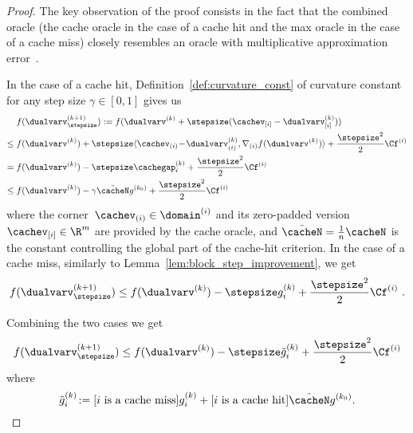 \documentclass{article}
\begin{document}
\begin{proof}
The key observation of the proof consists in the fact that the combined oracle (the cache oracle in the case of a cache hit and the max oracle in the case of a cache miss) closely resembles an oracle with multiplicative approximation error~\citep[Eq.~(12) of Appendix~C]{lacosteJulien13bcfw}.

In the case of a cache hit, Definition~\ref{def:curvature_const} of curvature constant for any step size $\gamma \in [0,1]$ gives us
\begin{align*}
 &f(\dualvarv^{(k+1)}_\stepsize) := f(\dualvarv^{(k)}+\stepsize(\cachev_{[i]}-\dualvarv^{(k)}_{[i]})) \\
    \leq \; & f(\dualvarv^{(k)}) + \stepsize \langle \cachev_{(i)}\!-\!\dualvarv^{(k)}_{(i)}, \nabla_{(i)} f(\dualvarv^{(k)})\rangle + \frac{\stepsize^2}{2}\Cf^{(i)} \\
     = \;& f(\dualvarv^{(k)})- \stepsize \cachegap_i^{(k)} + \frac{\stepsize^2}{2}\Cf^{(i)} \\
     \leq \;& f(\dualvarv^{(k)}) - \gamma \tilde{\cacheN} g^{(k_0)} + \frac{\stepsize^2}{2}\Cf^{(i)}
\end{align*}
where the corner~$\cachev_{(i)} \in \domain^{(i)}$ and its zero-padded version~$\cachev_{[i]} \in \R^m$ are provided by the cache oracle, and $\tilde{\cacheN} = \frac1n \cacheN$ is the constant controlling the global part of the cache-hit criterion.
In the case of a cache miss, similarly to Lemma~\ref{lem:block_step_improvement}, we get
\begin{equation*}
    f(\dualvarv^{(k+1)}_\stepsize) \leq f(\dualvarv^{(k)}) - \stepsize g_i^{(k)} + \frac{\stepsize^2}{2}\Cf^{(i)} \ .
\end{equation*}

Combining the two cases we get 
\begin{equation}
\label{eq:cache_proof:block_descent}
    f(\dualvarv^{(k+1)}_\stepsize) \leq f(\dualvarv^{(k)}) - \stepsize \tilde{g}_i^{(k)} + \frac{\stepsize^2}{2}\Cf^{(i)}
\end{equation}
where
\[
\tilde{g}_i^{(k)}\! := [i \text{ is a cache miss}] g_i^{(k)}  +   [i \text{ is a cache hit}] \tilde{\cacheN} g^{(k_0)}.
\]
%
%
%



\end{proof}
\end{document}
